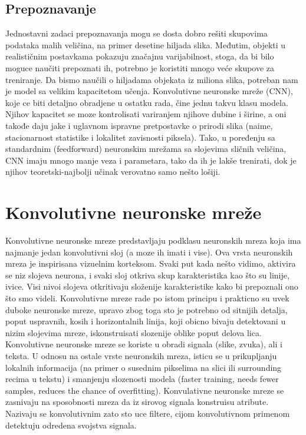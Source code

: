 \documentclass[a4paper]{article}
\begin{document}
\subsection{Prepoznavanje}

Jednostavni zadaci prepoznavanja mogu se dosta dobro rešiti skupovima podataka malih veličina, na primer desetine hiljada slika. Međutim, objekti u realističnim postavkama pokazuju značajnu varijabilnost, stoga, da bi bilo moguce naučiti prepoznati ih, potrebno je koristiti mnogo veće skupove za treniranje. Da bismo naučili o hiljadama objekata iz miliona slika, potreban nam je model sa velikim kapacitetom učenja. Konvolutivne neuronske mreže (CNN), koje ce biti detaljno obradjene u ostatku rada, čine jednu takvu klasu modela. Njihov kapacitet se moze kontrolisati variranjem njihove dubine i širine, a oni takođe daju jake i uglavnom ispravne pretpostavke o prirodi slika (naime, stacionarnost statistike i lokalitet zavisnosti piksela). Tako, u poređenju sa standardnim (feedforward) neuronskim mrežama sa slojevima sličnih veličina, CNN imaju mnogo manje veza i parametara, tako da ih je lakše trenirati, dok je njihov teoretski-najbolji učinak verovatno samo nešto lošiji.



\section{Konvolutivne neuronske mreže}	
\label{sec:podnaslov3}


Konvolutivne neuronske mreze predstavljaju podklasu neuronskih mreza koja ima najmanje jedan konvolutivni sloj (a moze ih imati i vise). Ova vrsta neuronskih mreza je inspirisana vizuelnim korteksom. Svaki put kada nešto vidimo, aktivira se niz slojeva neurona, i svaki sloj otkriva skup karakteristika kao što su linije, ivice. Visi nivoi slojeva otkritivaju složenije karakteristike kako bi prepoznali ono što smo videli. Konvolutivne mreze rade po istom principu i prakticno su uvek duboke neuronske mreze, upravo zbog toga sto je potrebno od sitnijih detalja, poput uspravnih, kosih i horizontalnih linija, koji obicno bivaju detektovani u nizim slojevima mreze, iskonstruisati slozenije oblike poput delova lica. Konvolutivne neuronske mreze se koriste u obradi signala (slike, zvuka), ali i teksta. U odnosu na ostale vrste neuronskih mreza, isticu se u prikupljanju lokalnih informacija (na primer o susednim pikselima na slici ili surrounding recima u tekstu) i smanjenju slozenosti modela (faster training, needs fewer samples, reduces the chance of overfitting). Konvulativne neuronske mreze se zasnivaju na sposobnosti mreza da iz sirovog signala konstruisu atribute. Nazivaju se konvolutivnim zato sto uce filtere, cijom konvolutivnom primenom detektuju odredena svojstva signala.
\end{document}
